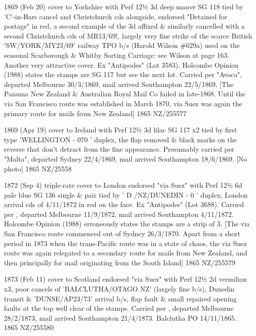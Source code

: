 \documentclass[justified]{tufte-book}
\begin{document}
%
{1869 (Feb 20) cover to Yorkshire with Perf 12½ 3d deep mauve SG 118 tied by 'C'-in-Bars cancel and Christchurch cds alongside, endorsed "Detained for postage" in red, a second example of the 3d affixed \& similarly cancelled with a second Christchurch cds of MR13/69!, largely very fine strike of the scarce British 'SW/YORK/MY23/69' railway TPO b/s (Harold Wilson \#629a) used on the seasonal Scarborough \& Whitby Sorting Carriage: see Wilson at page 163. Another very attractive cover. Ex "Antipodes" (Lot 3583). Holcombe Opinion (1988) states the stamps are SG 117 but see the next lot. Carried per "Avoca", departed Melbourne 30/3/1869, mail arrived Southampton 22/5/1869. [The Panama New Zealand \& Australian Royal Mail Co failed in late-1868. Until the via San Francisco route was established in March 1870, via Suez was again the primary route for mails from New Zealand]}%
{1865}%
{NZ/255577}%
{}%
{}
{}%
{}%

%
{1869 (Apr 19) cover to Ireland with Perf 12½ 3d lilac SG 117 x2 tied by first type 'WELLINGTON - 070 ' duplex, the flap removed \& black marks on the reverse that don't detract from the fine appearance. Presumably carried per "Malta", departed Sydney 22/4/1869, mail arrived Southampton 18/6/1869. [No photo]}%
{1865}%
{NZ/25558}%
{}%
{}
{}%
{}%

%
{1872 (Sep 4) triple-rate cover to London endorsed "via Suez" with Perf 12½ 6d pale blue SG 136 single \& pair tied by ' D /NZ/DUNEDIN - 0 ' duplex, London arrival cds of 4/11/1872 in red on the face. Ex "Antipodes" (Lot 3688). Carried per , departed Melbourne 11/9/1872, mail arrived Southampton 4/11/1872. Holcombe Opinion (1988) erroneously states the stamps are a strip of 3. [The via San Francisco route commenced out of Sydney 26/3/1870. Apart from a short period in 1873 when the trans-Pacific route was in a state of chaos, the via Suez route was again relegated to a secondary route for mails from New Zealand, and then principally for mail originating from the South Island]}%
{1865}%
{NZ/255579}%
{}%
{}
{}%
{}%

%
{1873 (Feb 11) cover to Scotland endorsed "via Suez" with Perf 12½ 2d vermilion x3, poor cancels of 'BALCLUTHA/OTAGO NZ' (largely fine b/s), Dunedin transit \& 'DUNSE/AP23/73' arrival b/s, flap fault \& small repaired opening faults at the top well clear of the stamps. Carried per , departed Melbourne 28/2/1873, mail arrived Southampton 21/4/1873. Balclutha PO 14/11/1865.}%
{1865}%
{NZ/255580}%
{}%
{}
{}%
{}%
\end{document}
